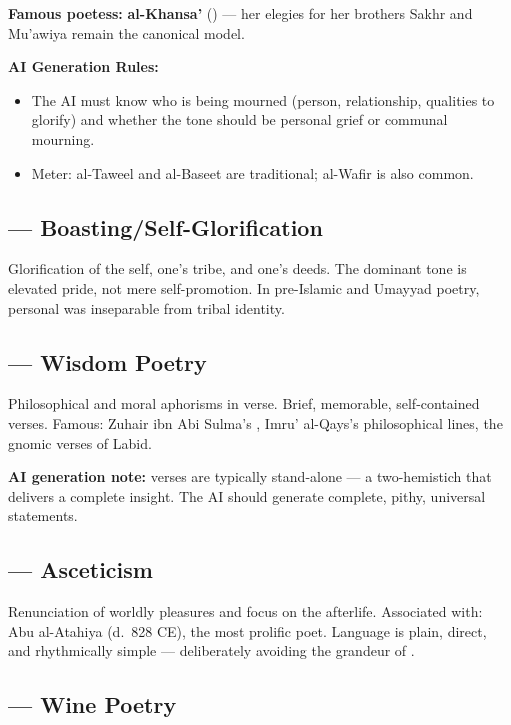 \textbf{Famous poetess:} \textbf{al-Khansa'} () — her elegies for her brothers Sakhr and Mu'awiya remain the canonical model.

\textbf{AI Generation Rules:}
\begin{itemize}
  \item The AI must know who is being mourned (person, relationship, qualities to glorify) and whether the tone should be personal grief or communal mourning.
  \item Meter: al-Taweel and al-Baseet are traditional; al-Wafir is also common.
\end{itemize}

\subsection{ — Boasting/Self-Glorification}
\label{subsec:fakhr}

Glorification of the self, one's tribe, and one's deeds. The dominant tone is elevated pride, not mere self-promotion. In pre-Islamic and Umayyad poetry, personal  was inseparable from tribal identity.

\subsection{ — Wisdom Poetry}
\label{subsec:hikma}

Philosophical and moral aphorisms in verse. Brief, memorable, self-contained verses. Famous: Zuhair ibn Abi Sulma's , Imru' al-Qays's philosophical lines, the gnomic verses of Labid.

\textbf{AI generation note:}  verses are typically stand-alone — a two-hemistich  that delivers a complete insight. The AI should generate complete, pithy, universal statements.

\subsection{ — Asceticism}
\label{subsec:zuhd}

Renunciation of worldly pleasures and focus on the afterlife. Associated with: Abu al-Atahiya (d.~828 CE), the most prolific  poet. Language is plain, direct, and rhythmically simple — deliberately avoiding the grandeur of .

\subsection{ — Wine Poetry}
\label{subsec:khamriyyat}

